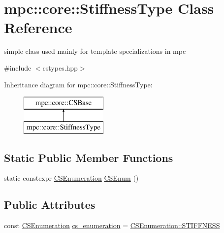 \hypertarget{structmpc_1_1core_1_1_stiffness_type}{}\section{mpc\+:\+:core\+:\+:Stiffness\+Type Class Reference}
\label{structmpc_1_1core_1_1_stiffness_type}


simple class used mainly for template specializations in mpc  




{\ttfamily \#include $<$cstypes.\+hpp$>$}

Inheritance diagram for mpc\+:\+:core\+:\+:Stiffness\+Type\+:\begin{figure}[H]
\begin{center}
\leavevmode
\includegraphics[height=2.000000cm]{structmpc_1_1core_1_1_stiffness_type}
\end{center}
\end{figure}
\subsection*{Static Public Member Functions}
\begin{DoxyCompactItemize}
\item 
static constexpr \mbox{\hyperlink{namespacempc_1_1core_ad3e8e7d43bfc9202d954d999f7d5c991}{C\+S\+Enumeration}} \mbox{\hyperlink{structmpc_1_1core_1_1_stiffness_type_a29224ca8f2111b45e79b0b2179104347}{C\+S\+Enum}} ()
\end{DoxyCompactItemize}
\subsection*{Public Attributes}
\begin{DoxyCompactItemize}
\item 
const \mbox{\hyperlink{namespacempc_1_1core_ad3e8e7d43bfc9202d954d999f7d5c991}{C\+S\+Enumeration}} \mbox{\hyperlink{structmpc_1_1core_1_1_stiffness_type_aaa2009a4b1aaebb597f2ac96a7d587bf}{cs\+\_\+enumeration}} = \mbox{\hyperlink{namespacempc_1_1core_ad3e8e7d43bfc9202d954d999f7d5c991aa231c1d74fe18f9e82224588887d1971}{C\+S\+Enumeration\+::\+S\+T\+I\+F\+F\+N\+E\+SS}}
\end{DoxyCompactItemize}


